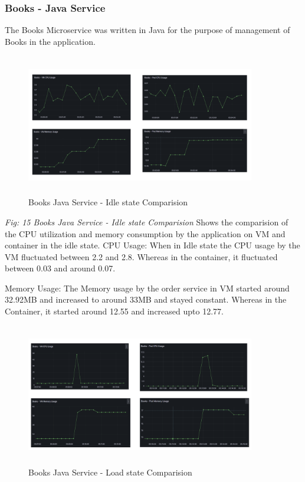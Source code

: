 \subsubsection{ Books - Java Service} The Books Microservice was written in Java for the purpose of management of Books in the application.  
\begin{figure}[!h]
    \centering
    \includegraphics[width=10cm, height=6.2cm]{images/book-cpu-idle-comp.png}
    \caption{Books Java Service - Idle state Comparision}
\end{figure}

\emph{Fig: 15 Books Java Service - Idle state Comparision} Shows the comparision of the CPU utilization and memory consumption by the application on VM and container in the idle state.
CPU Usage: When in Idle state the CPU usage by the VM fluctuated between 2.2 and 2.8. Whereas in the container, it fluctuated between 0.03 and around 0.07.

Memory Usage:  The Memory usage by the order service in VM started around 32.92MB and increased to around 33MB and stayed constant. Whereas in the Container, it started around 12.55 and increased upto 12.77.
\begin{figure}[!h]
    \centering
    \includegraphics[width=10cm, height=6.2cm]{images/book-cpu-load-comp.png}
    \caption{Books Java Service - Load state Comparision}
\end{figure}


